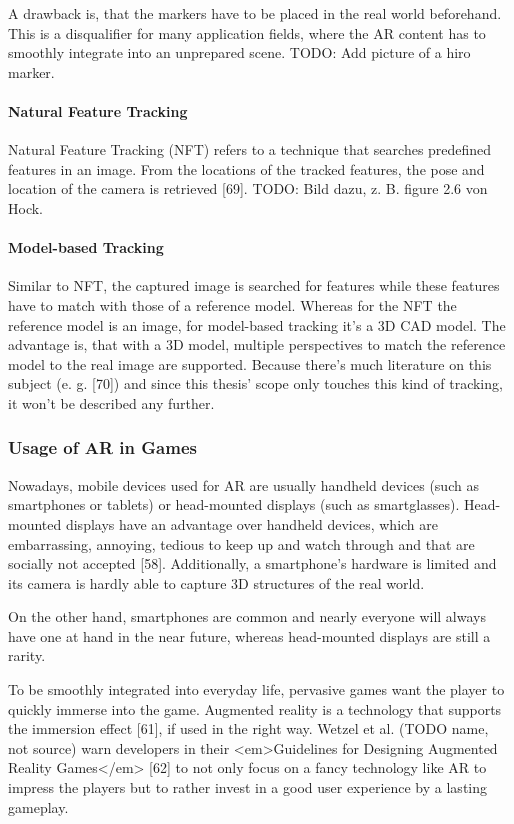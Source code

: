 A drawback is, that the markers have to be placed in the real world beforehand. This is a disqualifier for many application fields, where the AR content has to smoothly integrate into an unprepared scene. TODO: Add picture of a hiro marker.

\paragraph{Natural Feature Tracking}
Natural Feature Tracking (NFT) refers to a technique that searches predefined features in an image. From the locations of the tracked features, the pose and location of the camera is retrieved [69]. TODO: Bild dazu, z. B. figure 2.6 von Hock.

\paragraph{Model-based Tracking}
Similar to NFT, the captured image is searched for features while these features have to match with those of a reference model. Whereas for the NFT the reference model is an image, for model-based tracking it’s a 3D CAD model. The advantage is, that with a 3D model, multiple perspectives to match the reference model to the real image are supported.
Because there’s much literature on this subject (e. g. [70]) and since this thesis’ scope only touches this kind of tracking, it won’t be described any further.

\subsubsection{Usage of AR in Games}
Nowadays, mobile devices used for AR are usually handheld devices (such as smartphones or tablets) or head-mounted displays (such as smartglasses). Head-mounted displays have an advantage over handheld devices, which are embarrassing, annoying, tedious to keep up and watch through and that are socially not accepted [58]. Additionally, a smartphone’s hardware is limited and its camera is hardly able to capture 3D structures of the real world.

On the other hand, smartphones are common and nearly everyone will always have one at hand in the near future, whereas head-mounted displays are still a rarity.

To be smoothly integrated into everyday life, pervasive games want the player to quickly immerse into the game. Augmented reality is a technology that supports the immersion effect [61], if used in the right way. Wetzel et al. (TODO name, not source) warn developers in their <em>Guidelines for Designing Augmented Reality Games</em> [62] to not only focus on a fancy technology like AR to impress the players but to rather invest in a good user experience by a lasting gameplay.

